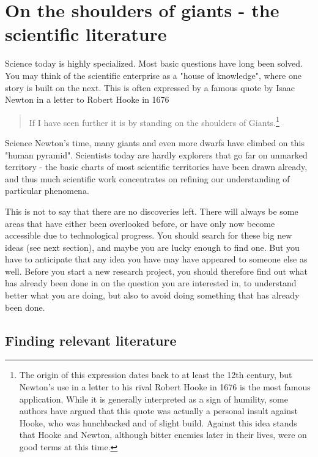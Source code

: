 \documentclass{tufte-book}
\begin{document}


\chapter{On the shoulders of giants - the scientific literature}

Science today is highly specialized. Most basic questions have long been solved. You may think of the scientific enterprise as a "house of knowledge", where one story is built on the next. This is often expressed by a famous quote by Isaac Newton in a letter to Robert Hooke in 1676

\begin{quote}
If I have seen further it is by standing on the shoulders of Giants.\footnote{The origin of this expression dates back to at least the 12th century, but Newton's use in a letter to his rival Robert Hooke in 1676 is the most famous application. While it is generally interpreted as a sign of humility, some authors have argued that this quote was actually a personal insult against Hooke, who was hunchbacked and of slight build. Against this idea stands that Hooke and Newton, although bitter enemies later in their lives, were on good terms at this time.}
\end{quote}

Science Newton's time, many giants and even more dwarfs have climbed on this "human pyramid". Scientists today are hardly explorers that go far on unmarked territory - the basic charts of most scientific territories have been drawn already, and thus much scientific work concentrates on refining our understanding of particular phenomena. 

This is not to say that there are no discoveries left. There will always be some areas that have either been overlooked before, or have only now become accessible due to technological progress. You should search for these big new ideas (see next section), and maybe you are lucky enough to find one. But you have to anticipate that any idea you have may have appeared to someone else as well. Before you start a new research project, you should therefore find out what has already been done in on the question you are interested in, to understand better what you are doing, but also to avoid doing something that has already been done. 


\section{Finding relevant literature}
 
\end{document}
